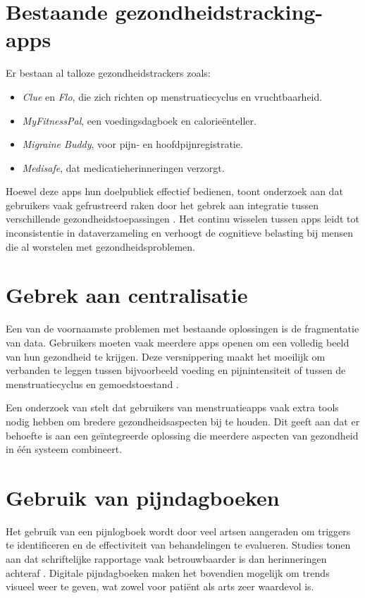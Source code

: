 \section{Bestaande gezondheidstracking-apps}
Er bestaan al talloze gezondheidstrackers zoals:
\begin{itemize}
  \item \textit{Clue} en \textit{Flo}, die zich richten op menstruatiecyclus en vruchtbaarheid.
  \item \textit{MyFitnessPal}, een voedingsdagboek en calorieënteller.
  \item \textit{Migraine Buddy}, voor pijn- en hoofdpijnregistratie.
  \item \textit{Medisafe}, dat medicatieherinneringen verzorgt.
\end{itemize}
Hoewel deze apps hun doelpubliek effectief bedienen, toont onderzoek aan dat gebruikers vaak gefrustreerd raken door het gebrek aan integratie tussen verschillende gezondheidstoepassingen \autocite{Fritz2015}. Het continu wisselen tussen apps leidt tot inconsistentie in dataverzameling en verhoogt de cognitieve belasting bij mensen die al worstelen met gezondheidsproblemen.

\section{Gebrek aan centralisatie}
Een van de voornaamste problemen met bestaande oplossingen is de fragmentatie van data. Gebruikers moeten vaak meerdere apps openen om een volledig beeld van hun gezondheid te krijgen. Deze versnippering maakt het moeilijk om verbanden te leggen tussen bijvoorbeeld voeding en pijnintensiteit of tussen de menstruatiecyclus en gemoedstoestand \autocite{Lupton2014}. 

Een onderzoek van \textcite{Sundstrom2016} stelt dat gebruikers van menstruatieapps vaak extra tools nodig hebben om bredere gezondheidsaspecten bij te houden. Dit geeft aan dat er behoefte is aan een geïntegreerde oplossing die meerdere aspecten van gezondheid in één systeem combineert.

\section{Gebruik van pijndagboeken}
Het gebruik van een pijnlogboek wordt door veel artsen aangeraden om triggers te identificeren en de effectiviteit van behandelingen te evalueren. Studies tonen aan dat schriftelijke rapportage vaak betrouwbaarder is dan herinneringen achteraf \autocite{Stone2002}. Digitale pijndagboeken maken het bovendien mogelijk om trends visueel weer te geven, wat zowel voor patiënt als arts zeer waardevol is.

